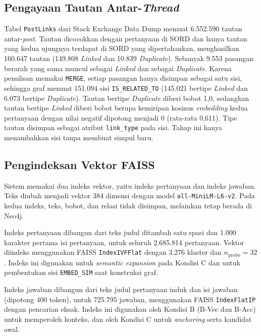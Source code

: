 \subsection{Pengayaan Tautan Antar-\emph{Thread}}
\label{subsec:implementasi-pengayaan-tautan}

Tabel \texttt{PostLinks} dari Stack Exchange Data Dump memuat 6.552.590 tautan antar-\emph{post}. Tautan dicocokkan dengan pertanyaan di SORD dan hanya tautan yang kedua ujungnya terdapat di SORD yang dipertahankan, menghasilkan 160.647 tautan (149.808 \emph{Linked} dan 10.839 \emph{Duplicate}). Sebanyak 9.553 pasangan berarah yang sama muncul sebagai \emph{Linked} dan sebagai \emph{Duplicate}. Karena penulisan memakai \texttt{MERGE}, setiap pasangan hanya disimpan sebagai satu sisi, sehingga graf memuat 151.094 sisi \texttt{IS\_RELATED\_TO} (145.021 bertipe \emph{Linked} dan 6.073 bertipe \emph{Duplicate}). Tautan bertipe \emph{Duplicate} diberi bobot 1,0, sedangkan tautan bertipe \emph{Linked} diberi bobot berupa kemiripan kosinus \emph{embedding} kedua pertanyaan dengan nilai negatif dipotong menjadi 0 (rata-rata 0,611). Tipe tautan disimpan sebagai atribut \texttt{link\_type} pada sisi. Tahap ini hanya menambahkan sisi tanpa membuat simpul baru.

\subsection{Pengindeksan Vektor FAISS}
\label{subsec:implementasi-indeks-vektor}

Sistem memakai dua indeks vektor, yaitu indeks pertanyaan dan indeks jawaban. Teks diubah menjadi vektor 384 dimensi dengan model \texttt{all-MiniLM-L6-v2}. Pada kedua indeks, teks, bobot, dan relasi tidak disimpan, melainkan tetap berada di Neo4j.

Indeks pertanyaan dibangun dari teks judul ditambah satu spasi dan 1.000 karakter pertama isi pertanyaan, untuk seluruh 2.685.814 pertanyaan. Vektor diindeks menggunakan FAISS \texttt{IndexIVFFlat} dengan 3.276 klaster dan $n_{\mathrm{probe}} = 32$. Indeks ini digunakan untuk \emph{semantic expansion} pada Kondisi C dan untuk pembentukan sisi \texttt{EMBED\_SIM} saat konstruksi graf.

Indeks jawaban dibangun dari teks judul pertanyaan induk dan isi jawaban (dipotong 400 token), untuk 725.795 jawaban, menggunakan FAISS \texttt{IndexFlatIP} dengan pencarian eksak. Indeks ini digunakan oleh Kondisi B (B-Vec dan B-Acc) untuk memperoleh konteks, dan oleh Kondisi C untuk \emph{anchoring} serta kandidat awal.

